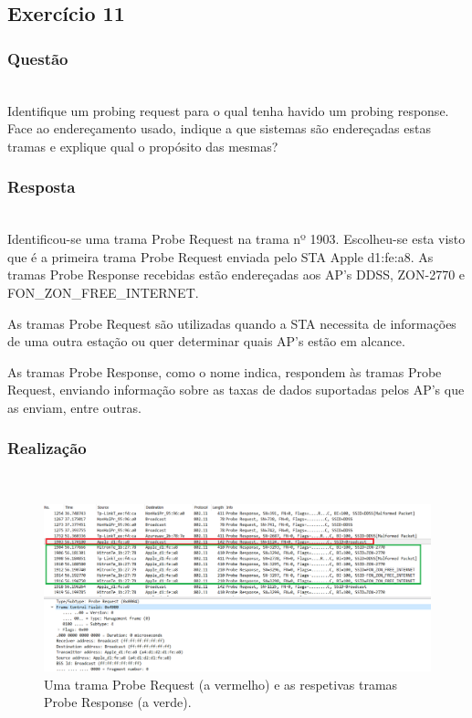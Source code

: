 \documentclass{llncs}
\begin{document}
\clearpage
\subsection{Exercício 11}
\subsubsection{Questão}\rule[-10pt]{0pt}{10pt}\\

Identifique um probing request para o qual tenha havido um probing response. Face ao endereçamento usado, indique a que sistemas são endereçadas estas tramas e explique qual o propósito das mesmas?

\subsubsection{Resposta}\rule[-10pt]{0pt}{10pt}\\

Identificou-se uma trama Probe Request na trama nº 1903. Escolheu-se esta visto que é a primeira trama Probe Request enviada pelo STA Apple d1:fe:a8. As tramas Probe Response recebidas estão endereçadas aos AP's DDSS, ZON-2770 e FON\_ZON\_FREE\_INTERNET. 
\par As tramas Probe Request são utilizadas quando a STA necessita de informações de uma outra estação ou quer determinar quais AP's estão em alcance. 
\par As tramas Probe Response, como o nome indica, respondem às tramas Probe Request, enviando informação sobre as taxas de dados suportadas pelos AP's que as enviam, entre outras.

\subsubsection{Realização}\rule[-10pt]{0pt}{10pt}\\

\begin{figure}
  \begin{center}
  \includegraphics[scale=0.35]{imagens/request_response.png} 
  \end{center}
  \caption{Uma trama Probe Request (a vermelho) e as respetivas tramas Probe Response (a verde).}
  \label{fig:probe_filter}
\end{figure}
\end{document}
